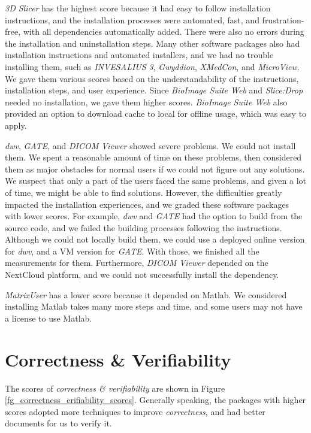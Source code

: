 \textit{3D Slicer} has the highest score because it had easy to follow installation instructions, and the installation processes were automated, fast, and frustration-free, with all dependencies automatically added. There were also no errors during the installation and uninstallation steps. Many other software packages also had installation instructions and automated installers, and we had no trouble installing them, such as \textit{INVESALIUS 3}, \textit{Gwyddion}, \textit{XMedCon}, and \textit{MicroView}. We gave them various scores based on the understandability of the instructions, installation steps, and user experience. Since \textit{BioImage Suite Web} and \textit{Slice:Drop} needed no installation, we gave them higher scores. \textit{BioImage Suite Web} also provided an option to download cache to local for offline usage, which was easy to apply.

\textit{dwv}, \textit{GATE}, and \textit{DICOM Viewer} showed severe problems. We could not install them. We spent a reasonable amount of time on these problems, then considered them as major obstacles for normal users if we could not figure out any solutions. We suspect that only a part of the users faced the same problems, and given a lot of time, we might be able to find solutions. However, the difficulties greatly impacted the installation experiences, and we graded these software packages with lower scores. For example, \textit{dwv} and \textit{GATE} had the option to build from the source code, and we failed the building processes following the instructions. Although we could not locally build them, we could use a deployed online version for \textit{dwv}, and a VM version for \textit{GATE}. With those, we finished all the measurements for them. Furthermore, \textit{DICOM Viewer} depended on the NextCloud platform, and we could not successfully install the dependency.

\textit{MatrixUser} has a lower score because it depended on Matlab. We considered installing Matlab takes many more steps and time, and some users may not have a license to use Matlab.

\section{Correctness \& Verifiability}
\label{sec_result_correctness_verifiability}

The scores of \textit{correctness \& verifiability} are shown in Figure \ref{fg_correctness_erifiability_scores}. Generally speaking, the packages with higher scores adopted more techniques to improve \textit{correctness}, and had better documents for us to verify it.

